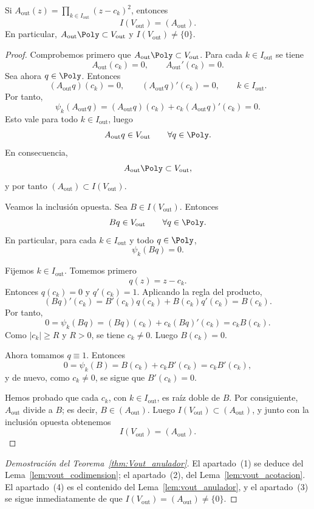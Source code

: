 \begin{lem}\label{lem:vout_anulador}
	Si $A_{\mathrm{out}}(z)=\prod_{k\in I_{\mathrm{out}}}(z-c_k)^2$, entonces
	\[
		I(V_{\mathrm{out}})=(A_{\mathrm{out}}).
	\]
	En particular, $A_{\mathrm{out}}\Poly\subset V_{\mathrm{out}}$ y $I(V_{\mathrm{out}})\neq\{0\}$.
\end{lem}
\begin{proof}
	Comprobemos primero que $A_{\mathrm{out}}\Poly\subset V_{\mathrm{out}}$.
	Para cada $k\in I_{\mathrm{out}}$ se tiene
	\[
		A_{\mathrm{out}}(c_k)=0,
		\qquad
		A_{\mathrm{out}}'(c_k)=0.
	\]
	Sea ahora $q\in\Poly$. Entonces
	\[
		(A_{\mathrm{out}}q)(c_k)=0,
		\qquad
		(A_{\mathrm{out}}q)'(c_k)=0,
		\qquad k\in I_{\mathrm{out}}.
	\]
	Por tanto,
	\[
		\psi_k(A_{\mathrm{out}}q)
		=
		(A_{\mathrm{out}}q)(c_k)+c_k(A_{\mathrm{out}}q)'(c_k)
		=
		0.
	\]
	Esto vale para todo $k\in I_{\mathrm{out}}$, luego
	\[
		A_{\mathrm{out}}q\in V_{\mathrm{out}}
		\qquad \forall q\in\Poly.
	\]
	En consecuencia,
	\[
		A_{\mathrm{out}}\Poly\subset V_{\mathrm{out}},
	\]
	y por tanto $(A_{\mathrm{out}})\subset I(V_{\mathrm{out}})$.

	Veamos la inclusión opuesta. Sea $B\in I(V_{\mathrm{out}})$. Entonces
	\[
		Bq\in V_{\mathrm{out}}
		\qquad \forall q\in\Poly.
	\]
	En particular, para cada $k\in I_{\mathrm{out}}$ y todo $q\in\Poly$,
	\[
		\psi_k(Bq)=0.
	\]

	Fijemos $k\in I_{\mathrm{out}}$. Tomemos primero
	\[
		q(z)=z-c_k.
	\]
	Entonces $q(c_k)=0$ y $q'(c_k)=1$. Aplicando la regla del producto,
	\[
		(Bq)'(c_k)=B'(c_k)q(c_k)+B(c_k)q'(c_k)=B(c_k).
	\]
	Por tanto,
	\[
		0=\psi_k(Bq)=(Bq)(c_k)+c_k(Bq)'(c_k)=c_kB(c_k).
	\]
	Como $|c_k|\ge R$ y $R>0$, se tiene $c_k\neq 0$. Luego $B(c_k)=0$.

	Ahora tomamos $q\equiv 1$. Entonces
	\[
		0=\psi_k(B)=B(c_k)+c_kB'(c_k)=c_kB'(c_k),
	\]
	y de nuevo, como $c_k\neq 0$, se sigue que $B'(c_k)=0$.

	Hemos probado que cada $c_k$, con $k\in I_{\mathrm{out}}$, es raíz doble de $B$.
	Por consiguiente, $A_{\mathrm{out}}$ divide a $B$; es decir, $B\in (A_{\mathrm{out}})$.
	Luego $I(V_{\mathrm{out}})\subset (A_{\mathrm{out}})$, y junto con la inclusión opuesta obtenemos
	\[
		I(V_{\mathrm{out}})=(A_{\mathrm{out}}).
	\]
\end{proof}

\begin{proof}[Demostración del Teorema~\ref{thm:Vout_anulador}]
	El apartado~(1) se deduce del Lema~\ref{lem:vout_codimension}; el apartado~(2),
	del Lema~\ref{lem:vout_acotacion}. El apartado~(4) es el contenido del
	Lema~\ref{lem:vout_anulador}, y el apartado~(3) se sigue inmediatamente de que
	$I(V_{\mathrm{out}})=(A_{\mathrm{out}})\neq\{0\}$.
\end{proof}

